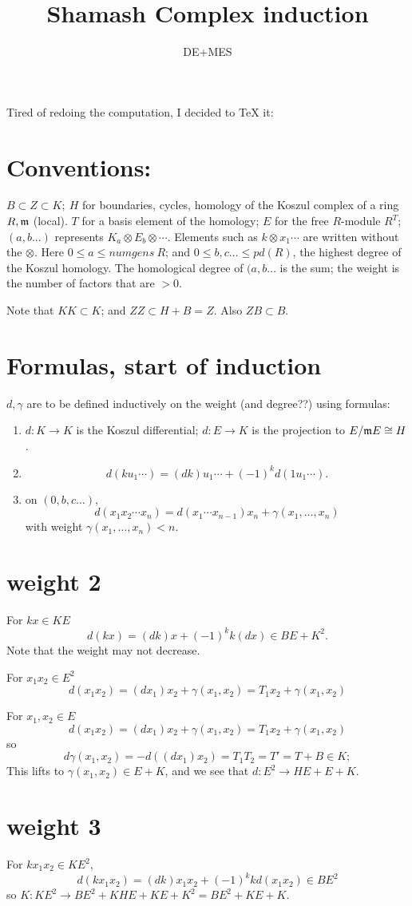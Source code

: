 \documentclass[11pt]{amsart}
\title{Shamash Complex induction}
\author{DE+MES}
\def\g{{\gamma}}
\def\mm{{\frak m}}
\begin{document}
\maketitle
Tired of redoing the computation, I decided to TeX it:

\section{Conventions:} $B\subset Z \subset K;\ H$ for boundaries, cycles, homology of the Koszul complex of a  ring $R,\mm$ (local). $T$ for a basis element of the homology; $E$ for the free $R$-module $R^T$; 
$(a,b...)$ represents $K_a\otimes E_b\otimes \cdots$. Elements such as $k\otimes x_1\cdots$ are written without the $\otimes$.
Here $0\leq a\leq numgens\ R$; and $0\leq b,c\dots\leq pd(R)$, the highest degree of the Koszul homology. The homological degree of $(a,b\dots$ is the sum; the weight is the
number of factors that are $>0$.

Note that $KK \subset K$; and $ZZ\subset H+B = Z$. Also $ZB\subset B$.

\section{Formulas, start of induction}
$d,\g$ are to be defined inductively on the weight (and degree??) using formulas:

\begin{enumerate}
\item $d:K\to K$ is the Koszul differential; $d: E \to K$ is the projection to $E/\mm E \cong H$.
\item 
$$
d(ku_1\cdots) = (dk)u_1\cdots +(-1)^kd(1u_1\cdots).
$$
\item
on $(0,b,c\dots)$, 
$$
d(x_1x_2\cdots x_n) = d(x_1\cdots x_{n-1})x_n+\g(x_1,\dots, x_n)
$$
with weight $\g(x_1,\dots, x_n)<n$.
\end{enumerate}

\section{weight 2} 
For $kx\in KE$ 
$$
d(kx) = (dk)x+(-1)^k k(dx) \in BE+K^2.
$$
Note that the weight may not decrease.

For $x_1x_2\in E^2$
$$
d(x_1x_2)= (dx_1)x_2 +\g(x_1,x_2) = T_1x_2+\gamma(x_1,x_2)
$$


For $x_1,x_2\in E$
$$
d(x_1x_2)= (dx_1)x_2 +\g(x_1,x_2) = T_1x_2+\gamma(x_1,x_2)
$$
so 
$$
d\gamma(x_1,x_2) = -d((dx_1)x_2) = T_1T_2 = T' = T+B  \in K;
$$
This lifts to $\g(x_1,x_2) \in E+K$, 
and we see that $d:E^2\to HE+ E+K$.

\section{weight 3}
For $kx_1x_2\in KE^2$,
$$
d(kx_1x_2) = (dk)x_1x_2 + (-1)^k kd(x_1x_2) \in BE^2
$$
so $K: KE^2 \to BE^2+KHE+KE+K^2 = BE^2+KE+K.$
\end{document}
